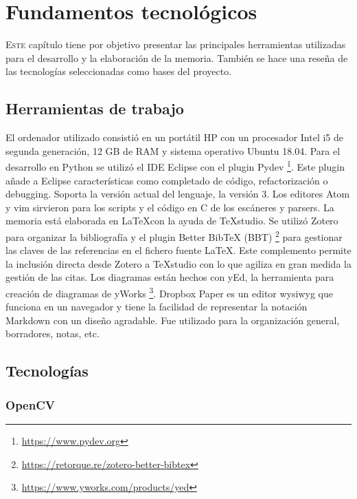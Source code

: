 
\chapter{Fundamentos tecnológicos}
\label{chap:fundamentos-tecnologicos}

\lettrine{E}{ste} capítulo tiene por objetivo presentar las principales herramientas utilizadas para el desarrollo y la elaboración de la memoria. También se hace una reseña de las tecnologías seleccionadas como bases del proyecto.

\section{Herramientas de trabajo}

El ordenador utilizado consistió en un portátil HP con un procesador Intel i5 de segunda generación, 12 GB de RAM y sistema operativo Ubuntu 18.04. Para el desarrollo en Python se utilizó el IDE Eclipse con el plugin Pydev
\footnote{\url{https://www.pydev.org}}. Este plugin añade a Eclipse características como completado de código, refactorización o debugging. Soporta la versión actual del lenguaje, la versión 3. Los editores Atom y vim sirvieron para los scripts y el código en C de los escáneres y parsers. La memoria está elaborada en \LaTeX con la ayuda de TeXstudio. Se utilizó Zotero para organizar la bibliografía y el plugin Better BibTeX (BBT) 
\footnote{\url{https://retorque.re/zotero-better-bibtex}} para gestionar las claves de las referencias en el fichero fuente \LaTeX. Este complemento permite la inclusión directa desde Zotero a TeXstudio con lo que agiliza en gran medida la gestión de las citas. Los diagramas están hechos con yEd, la herramienta para creación de diagramas de yWorks 
\footnote{\url{https://www.yworks.com/products/yed}}. Dropbox Paper es un editor \acrlong{wysiwyg} que funciona en un navegador y tiene la facilidad de representar la notación Markdown con un diseño agradable. Fue utilizado para la organización general, borradores, notas, etc.

\section{Tecnologías}

\subsection{OpenCV}

